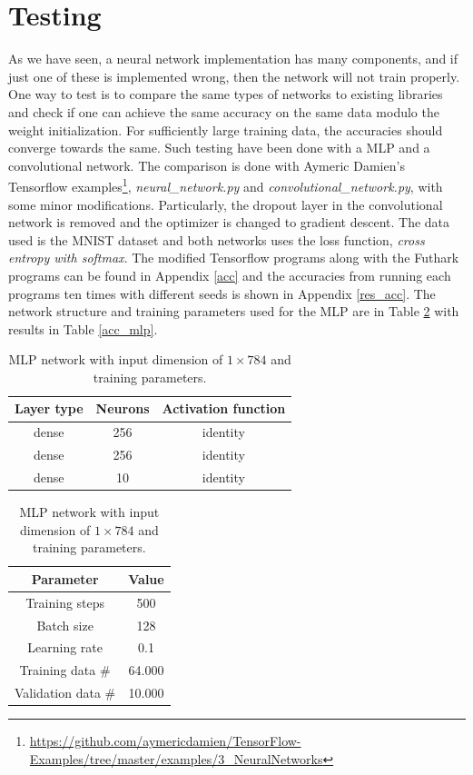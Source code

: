 \section{Testing}
As we have seen, a neural network implementation has many components, and if
just one of these is implemented wrong, then the network will not train
properly. 
One way to test is to compare the same types of networks to existing libraries
and check if one can achieve the same accuracy on the same data modulo the
weight initialization. 
For sufficiently large training data, the accuracies should converge towards the
same. 
Such testing have been done with a MLP and a convolutional network. 
The comparison is done with {Aymeric Damien}'s Tensorflow
examples\footnote{\url{https://github.com/aymericdamien/TensorFlow-Examples/tree/master/examples/3_NeuralNetworks}},
\emph{neural\_network.py} and \emph{convolutional\_network.py}, with some minor
modifications. 
Particularly, the dropout layer in the convolutional network is removed and the
optimizer is changed to gradient descent.  
The data used is the MNIST dataset and both networks uses the loss function,
\emph{cross entropy with softmax}. 
The modified Tensorflow programs along with the Futhark programs can be found in
Appendix \ref{acc} and the accuracies from running each programs ten times with
different seeds is shown in Appendix \ref{res_acc}. 
The network structure and training parameters used for the MLP are in Table
\ref{mlpstruct} with results in Table \ref{acc_mlp}.
\begin{table}[!htbp]
	\centering
	\begin{tabular}{|c|c|c|} \hline
		\textbf{Layer type} & \textbf{Neurons} & \textbf{Activation function} \\
		\hline \hline 
		dense & 256 & identity \\ \hline
		dense & 256 & identity \\ \hline
		dense & 10  & identity \\ \hline
	\end{tabular}
	\begin{tabular}{|c|c|} \hline 
		\textbf{Parameter} &  \textbf{Value} \\  \hline  \hline
		Training steps &  500 \\
		Batch size &  128 \\
		Learning rate & 0.1 \\ 
		Training data \# & 64.000  \\
		Validation data \# & 10.000\\ \hline
	\end{tabular}
	\caption{MLP network with input dimension of $1 \times 784$ and training
		parameters.}
	\label{mlpstruct}
\end{table} \newline 
